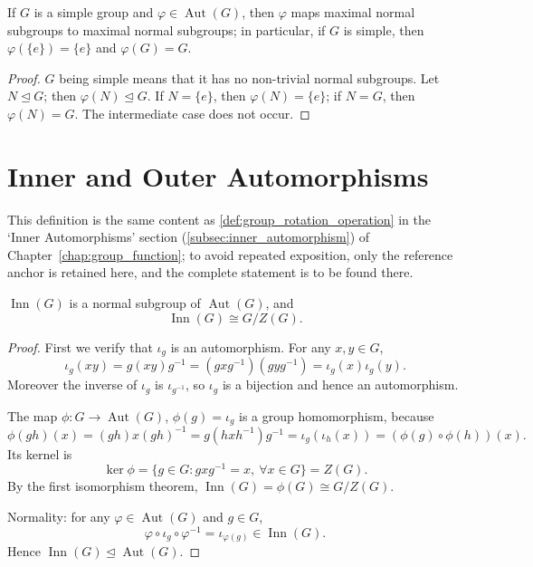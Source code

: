\begin{corollary}\label{cor:automorphism_simple}
If $G$ is a simple group and $\varphi\in\operatorname{Aut}(G)$, then $\varphi$ maps maximal normal subgroups to maximal normal subgroups; in particular, if $G$ is simple, then $\varphi(\{e\})=\{e\}$ and $\varphi(G)=G$.
\end{corollary}

\begin{proof}
$G$ being simple means that it has no non-trivial normal subgroups. Let $N\trianglelefteq G$; then $\varphi(N)\trianglelefteq G$. If $N=\{e\}$, then $\varphi(N)=\{e\}$; if $N=G$, then $\varphi(N)=G$. The intermediate case does not occur.
\end{proof}

\section{Inner and Outer Automorphisms}

\begin{definition}\label{def:higher_inner_automorphism}
This definition is the same content as \cref{def:group_rotation_operation} in the `Inner Automorphisms' section (\cref{subsec:inner_automorphism}) of Chapter~\ref{chap:group_function}; to avoid repeated exposition, only the reference anchor is retained here, and the complete statement is to be found there.
\end{definition}

\begin{proposition}\label{prop:inner_automorphism_group}
$\operatorname{Inn}(G)$ is a normal subgroup of $\operatorname{Aut}(G)$, and
\[
\operatorname{Inn}(G) \cong G/Z(G).
\]
\end{proposition}

\begin{proof}
First we verify that $\iota_g$ is an automorphism. For any $x,y\in G$,
\[
\iota_g(xy) = g(xy)g^{-1} = (gxg^{-1})(gyg^{-1}) = \iota_g(x)\iota_g(y).
\]
Moreover the inverse of $\iota_g$ is $\iota_{g^{-1}}$, so $\iota_g$ is a bijection and hence an automorphism.

The map $\phi: G\to\operatorname{Aut}(G)$, $\phi(g)=\iota_g$ is a group homomorphism, because
\[
\phi(gh)(x) = (gh)x(gh)^{-1} = g(hxh^{-1})g^{-1} = \iota_g(\iota_h(x)) = (\phi(g)\circ\phi(h))(x).
\]
Its kernel is
\[
\ker\phi = \{g\in G : gxg^{-1}=x,\ \forall x\in G\} = Z(G).
\]
By the first isomorphism theorem, $\operatorname{Inn}(G) = \phi(G) \cong G/Z(G)$.

Normality: for any $\varphi\in\operatorname{Aut}(G)$ and $g\in G$,
\[
\varphi\circ\iota_g\circ\varphi^{-1} = \iota_{\varphi(g)} \in\operatorname{Inn}(G).
\]
Hence $\operatorname{Inn}(G)\trianglelefteq\operatorname{Aut}(G)$.
\end{proof}

